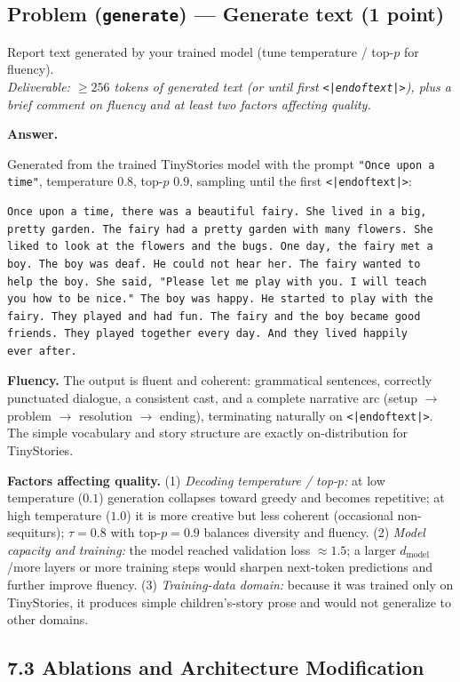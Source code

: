 \documentclass[11pt]{article}
\newenvironment{answer}%
  {\par\noindent\textbf{Answer.}\par\vspace{0.25em}\begingroup\color{black!85}}%
  {\endgroup\par\vspace{1em}}
\newcommand{\problem}[2]{%
  \subsection*{Problem (\texttt{#1}) --- #2}%
  \addcontentsline{toc}{subsection}{#1 --- #2}%
}
\begin{document}
\problem{generate}{Generate text (1 point)}
Report text generated by your trained model (tune temperature / top-$p$ for fluency). \\
\emph{Deliverable: $\geq 256$ tokens of generated text (or until first \texttt{<|endoftext|>}), plus a brief comment on fluency and at least two factors affecting quality.}
\begin{answer}
Generated from the trained TinyStories model with the prompt \texttt{"Once upon a time"}, temperature $0.8$, top-$p$ $0.9$, sampling until the first \texttt{<|endoftext|>}:

\begin{lstlisting}
Once upon a time, there was a beautiful fairy. She lived in a big,
pretty garden. The fairy had a pretty garden with many flowers. She
liked to look at the flowers and the bugs. One day, the fairy met a
boy. The boy was deaf. He could not hear her. The fairy wanted to
help the boy. She said, "Please let me play with you. I will teach
you how to be nice." The boy was happy. He started to play with the
fairy. They played and had fun. The fairy and the boy became good
friends. They played together every day. And they lived happily
ever after.
\end{lstlisting}

\textbf{Fluency.} The output is fluent and coherent: grammatical sentences, correctly punctuated dialogue, a consistent cast, and a complete narrative arc (setup $\to$ problem $\to$ resolution $\to$ ending), terminating naturally on \texttt{<|endoftext|>}. The simple vocabulary and story structure are exactly on-distribution for TinyStories.

\textbf{Factors affecting quality.} (1) \emph{Decoding temperature / top-$p$:} at low temperature ($0.1$) generation collapses toward greedy and becomes repetitive; at high temperature ($1.0$) it is more creative but less coherent (occasional non-sequiturs); $\tau=0.8$ with top-$p=0.9$ balances diversity and fluency. (2) \emph{Model capacity and training:} the model reached validation loss $\approx 1.5$; a larger $d_{\text{model}}$/more layers or more training steps would sharpen next-token predictions and further improve fluency. (3) \emph{Training-data domain:} because it was trained only on TinyStories, it produces simple children's-story prose and would not generalize to other domains.
\end{answer}


\subsection*{7.3 Ablations and Architecture Modification}
\end{document}

